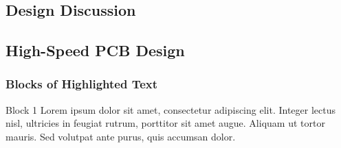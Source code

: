 \documentclass[aspectratio=43]{beamer}
\makeatletter
\newenvironment{backgroundblock}[2]{%
  \global\setbox\@backgroundblock=\vbox\bgroup%
    \unvbox\@backgroundblock%
    \vbox to0pt\bgroup\vskip#2\hbox to0pt\bgroup\hskip#1\relax%
}{\egroup\egroup\egroup}
\makeatother
\begin{document}
{\subsection{Design Discussion} 
\subsection{High-Speed PCB Design} 




\begin{frame}
\frametitle{Blocks of Highlighted Text}
\begin{block}{Block 1}
Lorem ipsum dolor sit amet, consectetur adipiscing elit. Integer lectus nisl, ultricies in feugiat rutrum, porttitor sit amet augue. Aliquam ut tortor mauris. Sed volutpat ante purus, quis accumsan dolor.
\end{block}


\end{frame}}
\end{document}
